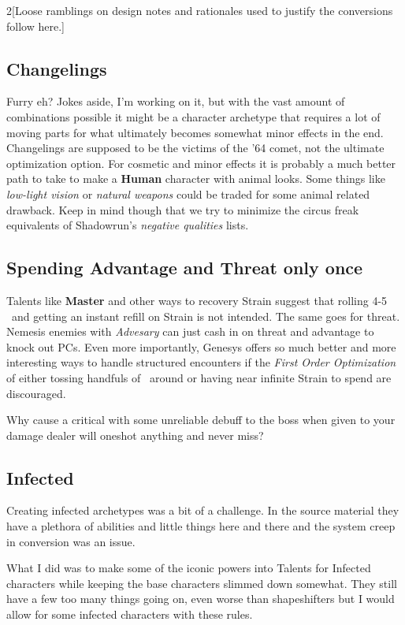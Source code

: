 \documentclass{book}
\begin{document}
\begin{multicols}{2}[Loose ramblings on design notes and rationales used to justify the conversions follow here.]
\subsection{Changelings}
Furry eh? Jokes aside, I'm working on it, but with the vast amount of combinations possible it might be a character archetype that requires a lot of moving parts for what ultimately becomes somewhat minor effects in the end. Changelings are supposed to be the victims of the '64 comet, not the ultimate optimization option. For cosmetic and minor effects it is probably a much better path to take to make a \textbf{Human} character with animal looks. Some things like \textit{low-light vision} or \textit{natural weapons} could be traded for some animal related drawback. Keep in mind though that we try to minimize the circus freak equivalents of Shadowrun's \textit{negative qualities} lists. 

\subsection{Spending  Advantage and Threat only once}
Talents like \textbf{Master} and other ways to recovery Strain suggest that rolling 4-5 \Advantage\ and getting an instant refill on Strain is not intended. The same goes for threat. Nemesis enemies with \textit{Advesary} can just cash in on threat and advantage to knock out PCs. Even more importantly, Genesys offers so much better and more interesting ways to handle structured encounters if the \textit{First Order Optimization} of either tossing handfuls of \BoostDie\ around or having near infinite Strain to spend are discouraged. 

Why cause a critical with some unreliable debuff to the boss when \mbox{\BoostDie \BoostDie \BoostDie \BoostDie \BoostDie} given to your damage dealer will oneshot anything and never miss? 

\subsection{Infected}
Creating infected archetypes was a bit of a challenge. In the source material they have a plethora of abilities and little things here and there and the system creep in conversion was an issue.

What I did was to make some of the iconic powers into Talents for Infected characters while keeping the base characters slimmed down somewhat. They still have a few too many things going on, even worse than shapeshifters but I would allow for some infected characters with these rules.


\end{multicols}
\end{document}
